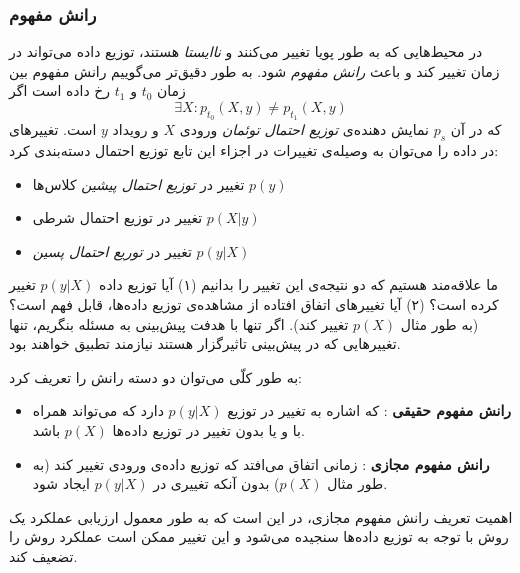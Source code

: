 
\subsubsection{
رانش مفهوم
}

در محیط‌هایی که به طور پویا تغییر می‌کنند و 
\textit{
ناایستا
} 
هستند، توزیع داده می‌تواند در زمان تغییر کند و باعث  
\textit{
رانش مفهوم
} 
شود. به طور دقیق‌تر می‌گوییم رانش مفهوم بین زمان 
$t_0$ 
و 
$t_1$ 
رخ داده است اگر 
\[
\exists X : p_{t_0} ( X , y ) \neq p_{t_1} ( X , y )
\]
که در آن 
$p_s$ 
نمایش دهنده‌ی 
\textit{
توزیع احتمال توئمان
} 
ورودی 
$X$ 
و رویداد
$y$ 
است. تغییرهای در داده را می‌توان به وصیله‌ی تغییرات در اجزاء این تابع توزیع احتمال دسته‌بندی کرد:
\begin{itemize}
\item 
تغییر در 
\textit{
توزیع احتمال پیشین
} 
کلاس‌ها 
$p(y)$

\item 
تغییر در توزیع احتمال شرطی 
$p( X | y )$

\item 
تغییر در 
\textit{
توریع احتمال پسین
}
$p ( y | X )$
\end{itemize}

ما علاقه‌مند هستیم که دو نتیجه‌ی این تغییر را بدانیم (۱) آیا توزیع داده 
$p( y | X )$ 
تغییر کرده است؟ (۲) آیا تغییرهای اتفاق افتاده از مشاهده‌ی توزیع داده‌ها، قابل فهم است؟ (به طور مثال 
$p( X )$ 
تغییر کند). اگر تنها با هدفت پیش‌بینی به مسئله بنگریم، تنها تغییرهایی که در پیش‌بینی تاثیرگزار هستند نیازمند تطبیق خواهند بود.


به طور کلّی می‌توان دو دسته رانش را تعریف کرد:
\begin{itemize}
\item \textbf{
رانش مفهوم حقیقی
}:‌ 
که اشاره به تغییر در توزیع 
$p( y | X )$ 
دارد که می‌تواند همراه با و یا بدون تغییر در توزیع داده‌ها 
$p(X)$ 
باشد.

\item \textbf{
رانش مفهوم مجازی
}: 
زمانی اتفاق  می‌افتد که توزیع داده‌ی ورودی تغییر کند (به طور مثال 
$p(X)$) 
بدون آنکه تغییری در 
$p( y | X )$ 
ایجاد شود.

\end{itemize}
اهمیت تعریف رانش مفهوم مجازی، در این است که به طور معمول ارزیابی عملکرد یک روش با توجه به توزیع داده‌ها سنجیده می‌شود و این تغییر ممکن است عملکرد روش را تضعیف کند.


